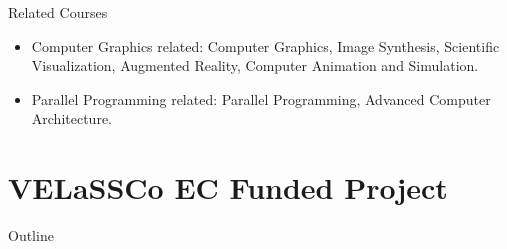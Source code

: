 \documentclass{beamer}
\begin{document}
\begin{frame}{Related Courses}
	\begin{itemize}
		\item Computer Graphics related: Computer Graphics, Image Synthesis, Scientific Visualization, Augmented Reality, Computer Animation and Simulation.
		\item Parallel Programming related: Parallel Programming, Advanced Computer Architecture.
	\end{itemize}
\end{frame}



%


\section{VELaSSCo EC Funded Project}


\begin{frame}{Outline}
\end{frame}
\end{document}
